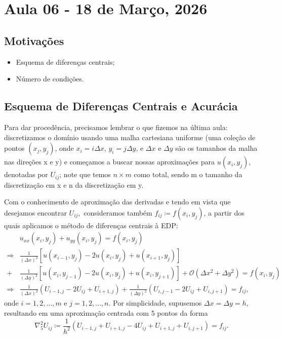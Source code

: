 \documentclass[../differential_methods.tex]{subfiles}
\begin{document}
\section{Aula 06 - 18 de Março, 2026}
\subsection{Motivações}
\begin{itemize}
	\item Esquema de diferenças centrais;
	\item Número de condições.
\end{itemize}
\subsection{Esquema de Diferenças Centrais e Acurácia}
Para dar procedência, precisamos lembrar o que fizemos na última aula: discretizamos o domínio usando uma malha cartesiana uniforme (uma coleção de pontos \((x_{j}, y_{j})\), onde \(x_{i}=i\Delta x\), \(y_{i}=j\Delta y\), e \(\Delta x\) e \(\Delta y\) são os tamanhos da malha nas direções x e y) e começamos a buscar nossas aproximações para \(u(x_{i}, y_{j})\), denotadas por \(U_{ij}\); note que temos \(n \times m\) como total, sendo m o tamanho da discretização em x e n da discretização em y.

Com o conhecimento de aproximação das derivadas e tendo em vista que desejamos encontrar \(U_{ij},\) consideramos também \(f_{ij}\coloneqq f(x_{i}, y_{j})\), a partir dos quais aplicamos o método de diferenças centrais à EDP:
\begin{align*}
	            & u_{xx}(x_{i}, y_{j})+u_{yy}(x_{i}, y_{j})=f(x_{i}, y_{j})                                                                             \\
	\Rightarrow & \frac{1}{(\Delta x)^{2}}[u(x_{i-1}, y_{j})-2u(x_{i}, y_{j})+u(x_{i+1}, y_{j})]                                                        \\
	+           & \frac{1}{(\Delta y)^{2}}[u(x_{i}, y_{j-1})-2u(x_{i}, y_{j})+u(x_{i}, y_{j+1})]+\mathcal{O}(\Delta x^{2}+\Delta y^{2})=f(x_{i}, y_{j}) \\
	\Rightarrow & \frac{1}{(\Delta x)^{2}}(U_{i-1, j}-2U_{ij}+U_{i+1, j})+\frac{1}{(\Delta y)^{2}}(U_{i, j-1}-2U_{ij}+ U_{i, j+1})=f_{ij},
\end{align*}
onde \(i=1,2,\dotsc ,m\) e \(j=1,2,\dotsc , n\). Por simplicidade, supusemos \(\Delta x = \Delta y = h\), resultando em uma aproximação centrada com 5 pontos da forma
\[
	\nabla_{5}^{2}U_{ij} \coloneqq \frac{1}{h^{2}}(U_{i-1, j}+U_{i+1, j}-4U_{ij}+U_{i+1, j}+U_{i, j+1})=f_{ij}.
\]
\end{document}
